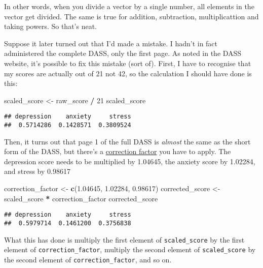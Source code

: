 \documentclass[]{book}
\newenvironment{Shaded}{\begin{snugshade}}{\end{snugshade}}
\newcommand{\DecValTok}[1]{\textcolor[rgb]{0.00,0.00,0.81}{#1}}
\newcommand{\FloatTok}[1]{\textcolor[rgb]{0.00,0.00,0.81}{#1}}
\newcommand{\KeywordTok}[1]{\textcolor[rgb]{0.13,0.29,0.53}{\textbf{#1}}}
\newcommand{\NormalTok}[1]{#1}
\newcommand{\OperatorTok}[1]{\textcolor[rgb]{0.81,0.36,0.00}{\textbf{#1}}}
\newcommand{\StringTok}[1]{\textcolor[rgb]{0.31,0.60,0.02}{#1}}
\begin{document}
In other words, when you divide a vector by a single number, all elements in the vector get divided. The same is true for addition, subtraction, multiplicattion and taking powers. So that's neat.

Suppose it later turned out that I'd made a mistake. I hadn't in fact administered the complete DASS, only the first page. As noted in the DASS website, it's possible to fix this mistake (sort of). First, I have to recognise that my scores are actually out of 21 not 42, so the calculation I should have done is this:

\begin{Shaded}
\begin{Highlighting}[]
\NormalTok{scaled_score <-}\StringTok{ }\NormalTok{raw_score }\OperatorTok{/}\StringTok{ }\DecValTok{21}
\NormalTok{scaled_score}
\end{Highlighting}
\end{Shaded}

\begin{verbatim}
## depression    anxiety     stress 
##  0.5714286  0.1428571  0.3809524
\end{verbatim}

Then, it turns out that page 1 of the full DASS is \emph{almost} the same as the short form of the DASS, but there's a \href{http://www2.psy.unsw.edu.au/dass/DASSFAQ.htm\#_28.__I_accidentally_administered_th}{correction factor} you have to apply. The depression score needs to be multiplied by 1.04645, the anxiety score by 1.02284, and stress by 0.98617

\begin{Shaded}
\begin{Highlighting}[]
\NormalTok{correction_factor <-}\StringTok{ }\KeywordTok{c}\NormalTok{(}\FloatTok{1.04645}\NormalTok{, }\FloatTok{1.02284}\NormalTok{, }\FloatTok{0.98617}\NormalTok{)}
\NormalTok{corrected_score <-}\StringTok{ }\NormalTok{scaled_score }\OperatorTok{*}\StringTok{ }\NormalTok{correction_factor}
\NormalTok{corrected_score}
\end{Highlighting}
\end{Shaded}

\begin{verbatim}
## depression    anxiety     stress 
##  0.5979714  0.1461200  0.3756838
\end{verbatim}

What this has done is multiply the first element of \texttt{scaled\_score} by the first element of \texttt{correction\_factor}, multiply the second element of \texttt{scaled\_score} by the second element of \texttt{correction\_factor}, and so on.
\end{document}
